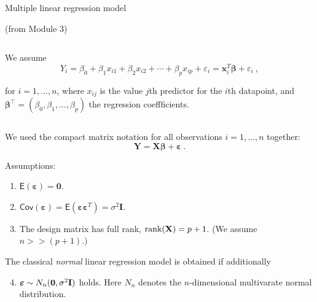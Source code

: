 \documentclass[10pt,ignorenonframetext,]{beamer}
\providecommand{\tightlist}{%
  \setlength{\itemsep}{0pt}\setlength{\parskip}{0pt}}
\begin{document}
\begin{frame}

\begin{block}{Multiple linear regression model}

(from Module 3)

\(~\)

We assume \[
 Y_i=\beta_0 + \beta_1 x_{i1}+\beta_2 x_{i2}+\cdots + \beta_p x_{ip}+\varepsilon_i={\boldsymbol x}_i^T{\boldsymbol\beta}+\varepsilon_i \ ,
\]

for \(i=1,\ldots,n\), where \(x_{ij}\) is the value \(j\)th predictor
for the \(i\)th datapoint, and
\({\boldsymbol\beta}^\top = (\beta_0,\beta_1,\ldots,\beta_p)\) the
regression coeffficients.

\(~\)

We used the compact matrix notation for all observations
\(i=1,\ldots,n\) together:
\[{\boldsymbol Y}={\boldsymbol {X}} \boldsymbol{\beta}+{\boldsymbol{\varepsilon}}  \ .\]

\end{block}

\end{frame}

\begin{frame}

Assumptions: \vspace{2mm}

\begin{enumerate}
\tightlist
\item
  \(\mathsf{E}(\boldsymbol{\varepsilon})=\boldsymbol{0}\). \vspace{2mm}
\item
  \(\mathsf{Cov}(\boldsymbol{\varepsilon})=\mathsf{E}(\boldsymbol{\varepsilon}\boldsymbol{\varepsilon}^T)=\sigma^2\boldsymbol{I}\).
  \vspace{2mm}
\item
  The design matrix has full rank, \(\text{rank}({\bf X})=p+1\). (We
  assume \(n>>(p+1)\).)
\end{enumerate}

\vspace{2mm}

The classical \emph{normal} linear regression model is obtained if
additionally

\begin{enumerate}
\setcounter{enumi}{3}
\tightlist
\item
  \(\boldsymbol\varepsilon\sim N_n({\boldsymbol 0},\sigma^2 {\bf I})\)
  holds. Here \(N_n\) denotes the \(n\)-dimensional multivarate normal
  distribution.
\end{enumerate}

\end{frame}
\end{document}
